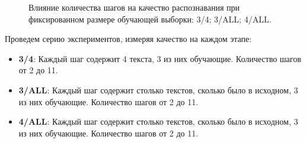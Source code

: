 \documentclass[12pt]{article}
\begin{document}
\begin{figure}[h!]  
\vspace{-2ex} \centering {}  
\hspace{2ex}
\hspace{2ex}
\caption{Влияние количества шагов на качество распознавания при фиксированном размере обучающей выборки:  3/4;  3/ALL;  4/ALL.} \label{fig:steps}
\end{figure}

Проведем серию экспериментов, измеряя качество на каждом этапе:

\begin{itemize}
	\item \textbf{3/4}: Каждый шаг содержит 4 текста, 3 из них обучающие. Количество шагов от 2 до 11. 
	\item \textbf{3/ALL}: Каждый шаг содержит столько текстов, сколько было в исходном, 3 из них обучающие. Количество шагов от 2 до 11. 
	\item \textbf{4/ALL}: Каждый шаг содержит столько текстов, сколько было в исходном, 3 из них обучающие. Количество шагов от 2 до 11. 
\end{itemize}
\end{document}
